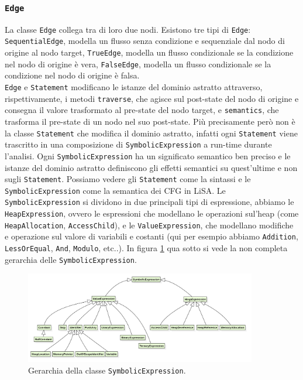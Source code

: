 \subsubsection{\texttt{Edge}}
La classe \texttt{Edge} collega tra di loro due nodi. Esistono tre tipi di \texttt{Edge}: \texttt{SequentialEdge}, modella un flusso senza condizione e sequenziale dal nodo di origine al nodo target, \texttt{TrueEdge}, modella un flusso condizionale se la condizione nel nodo di origine è vera, \texttt{FalseEdge}, modella un flusso condizionale se la condizione nel nodo di origine è falsa.
\\

\texttt{Edge} e \texttt{Statement} modificano le istanze del dominio astratto attraverso, rispettivamente, i metodi \texttt{traverse}, che agisce sul post-state del nodo di origine e consegna il valore trasformato al pre-state del nodo target, e \texttt{semantics}, che trasforma il pre-state di un nodo nel suo post-state. Più precisamente però non è la classe \texttt{Statement} che modifica il dominio astratto, infatti ogni \texttt{Statement} viene trascritto in una composizione di \texttt{SymbolicExpression} a run-time durante l'analisi. Ogni \texttt{SymbolicExpression} ha un significato semantico ben preciso e le istanze del dominio astratto definiscono gli effetti semantici su quest'ultime e non sugli \texttt{Statement}. Possiamo vedere gli \texttt{Statement} come la sintassi e le \texttt{SymbolicExpression} come la semantica dei CFG in LiSA. Le \texttt{SymbolicExpression} si dividono in due principali tipi di espressione, abbiamo le \texttt{HeapExpression}, ovvero le espressioni che modellano le operazioni sul'heap (come \texttt{HeapAllocation}, \texttt{AccessChild}), e le \texttt{ValueExpression}, che modellano modifiche e operazione sul valore di variabili e costanti (qui per esempio abbiamo \texttt{Addition}, \texttt{LessOrEqual}, \texttt{And}, \texttt{Modulo}, etc..). In figura \ref{fig:gerarchiaSymbolic} qua sotto si vede la non completa gerarchia delle \texttt{SymbolicExpression}.

\begin{figure}[ht]
	\centering
	\includegraphics[width=0.9\textwidth]{Immagini/gerarchiaSymbolicExpression.png}
	\caption{Gerarchia della classe \texttt{SymbolicExpression}.}
	\label{fig:gerarchiaSymbolic}
\end{figure}


